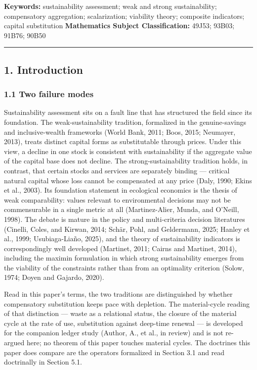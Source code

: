 \documentclass[11pt]{article}
\begin{document}
\textbf{Keywords:} sustainability assessment; weak and strong
sustainability; compensatory aggregation; scalarization; viability
theory; composite indicators; capital substitution \textbf{Mathematics
Subject Classification:} 49J53; 93B03; 91B76; 90B50

\begin{center}\rule{0.5\linewidth}{0.5pt}\end{center}

\subsection{1. Introduction}\label{introduction}

\subsubsection{1.1 Two failure modes}\label{two-failure-modes}

Sustainability assessment sits on a fault line that has structured the
field since its foundation. The weak-sustainability tradition,
formalized in the genuine-savings and inclusive-wealth frameworks (World
Bank, 2011; Boos, 2015; Neumayer, 2013), treats distinct capital forms
as substitutable through prices. Under this view, a decline in one stock
is consistent with sustainability if the aggregate value of the capital
base does not decline. The strong-sustainability tradition holds, in
contrast, that certain stocks and services are separately binding ---
critical natural capital whose loss cannot be compensated at any price
(Daly, 1990; Ekins et al., 2003). Its foundation statement in ecological
economics is the thesis of weak comparability: values relevant to
environmental decisions may not be commensurable in a single metric at
all (Martinez-Alier, Munda, and O'Neill, 1998). The debate is mature in
the policy and multi-criteria decision literatures (Cinelli, Coles, and
Kirwan, 2014; Sch\"ar, Pohl, and Geldermann, 2025; Hanley et al., 1999;
Usubiaga-Lia\~no, 2025), and the theory of sustainability indicators is
correspondingly well developed (Martinet, 2011; Cairns and Martinet,
2014), including the maximin formulation in which strong sustainability
emerges from the viability of the constraints rather than from an
optimality criterion (Solow, 1974; Doyen and Gajardo, 2020).

Read in this paper's terms, the two traditions are distinguished by
whether compensatory substitution keeps pace with depletion. The
material-cycle reading of that distinction --- waste as a relational
status, the closure of the material cycle at the rate of use,
substitution against deep-time renewal --- is developed for the
companion ledger study (Author, A., et al., in review) and is not
re-argued here; no theorem of this paper touches material cycles. The
doctrines this paper does compare are the operators formalized in
Section 3.1 and read doctrinally in Section 5.1.
\end{document}
